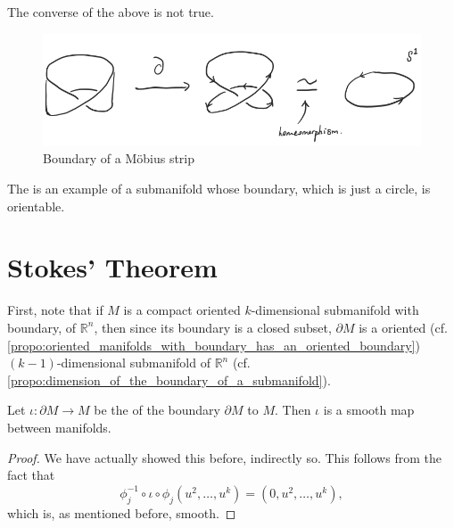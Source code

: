 \documentclass[notoc,notitlepage]{tufte-book}
\begin{document}
The converse of the above is not true.

\begin{eg}
  \begin{figure}[ht]
    \centering
    \includegraphics[width=0.7\linewidth]{images/boundary-of-a-mobius-strip.png}
    \caption{Boundary of a M\"{o}bius strip}
    \label{fig:boundary_of_a_mobius_strip}
  \end{figure}
  The  is an example of a 
  submanifold whose boundary, which is just a circle, is orientable.
\end{eg}


\section{Stokes' Theorem}%
\label{sec:stokes_theorem}

First, note that if $M$ is a compact oriented $k$-dimensional submanifold with
boundary, of $\mathbb{R}^n$, then since its boundary is a closed subset,
$\partial M$ is a  oriented (cf.
\cref{propo:oriented_manifolds_with_boundary_has_an_oriented_boundary}) $(k -
1)$-dimensional submanifold of $\mathbb{R}^n$ (cf.
\cref{propo:dimension_of_the_boundary_of_a_submanifold}).

\begin{lemma}\label{lemma:inclusion_map_as_a_smooth_map_between_submanifolds}
  Let $\iota : \partial M \to M$ be the  of the boundary
  $\partial M$ to $M$. Then $\iota$ is a smooth map between manifolds.
\end{lemma}

\begin{proof}
  We have actually showed this before, indirectly so. This follows from the fact
  that
  \begin{equation*}
    \phi_j^{-1} \circ \iota \circ \hat{\phi}_j (u^2, \ldots, u^k) = (0, u^2,
    \ldots, u^k),
  \end{equation*}
  which is, as mentioned before, smooth.
\end{proof}
\end{document}
